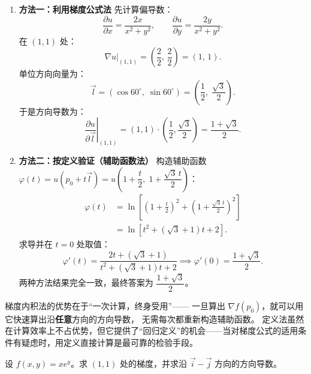 \documentclass[lang=cn,11pt]{elegantbook}
\begin{document}
\begin{solution}
\begin{enumerate}
  \item \textbf{方法一：利用梯度公式法}
  先计算偏导数：
  \[
  \frac{\partial u}{\partial x}=\frac{2x}{x^2+y^2},\qquad
  \frac{\partial u}{\partial y}=\frac{2y}{x^2+y^2}.
  \]
  在 $(1,1)$ 处：
  \[
  \left.\nabla u\right|_{(1,1)} =\left(\frac{2}{2},\,\frac{2}{2}\right)=(1,\,1).
  \]
  单位方向向量为：
  \[
  \vec l=(\cos 60^\circ,\;\sin 60^\circ) = \left(\frac12,\;\frac{\sqrt3}{2}\right).
  \]
  于是方向导数为：
  \[
  \left.\frac{\partial u}{\partial\vec l}\right|_{(1,1)}
  =(1,1)\cdot\left(\frac12,\frac{\sqrt3}{2}\right)
  = \frac{1+\sqrt3}{2}.
  \]

  \item \textbf{方法二：按定义验证（辅助函数法）}
  构造辅助函数 $\varphi(t)=u(p_0+t\vec l)=u\left(1+\dfrac{t}{2},\;1+\dfrac{\sqrt3\,t}{2}\right)$：
  \begin{align*}
  \varphi(t) &= \ln\left[\left(1+\frac{t}{2}\right)^{\!2} +\left(1+\frac{\sqrt3\,t}{2}\right)^{\!2}\right]\\
  &= \ln\left[t^2+(\sqrt3+1)t+2\right].
  \end{align*}
  求导并在 $t=0$ 处取值：
  \[
  \varphi'(t)=\frac{2t+(\sqrt3+1)}{t^2+(\sqrt3+1)t+2}
  \implies
  \varphi'(0)=\frac{1+\sqrt3}{2}.
  \]
  两种方法结果完全一致，最终答案为 $\boxed{\dfrac{1+\sqrt3}{2}}$。
\end{enumerate}
\end{solution}

\begin{remark}[两种方法的比较]
梯度内积法的优势在于“一次计算，终身受用”——
一旦算出 $\nabla f(p_0)$，就可以用它快速算出沿\textbf{任意}方向的方向导数，
无需每次都重新构造辅助函数。
定义法虽然在计算效率上不占优势，但它提供了“回归定义”的机会——当对梯度公式的适用条件有疑虑时，用定义直接计算是最可靠的检验手段。
\end{remark}

\begin{exercise}[梯度为零的方向导数] \label{ex:grad-zero-dir}
设 $f(x,y)=xe^y$。求 $(1,1)$ 处的梯度，并求沿 $\vec i-\vec j$ 方向的方向导数。
\end{exercise}
\end{document}
